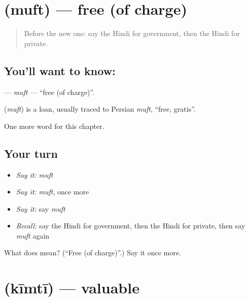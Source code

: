 \section[\texorpdfstring{\hi{मुफ़्त} (muft)}{मुफ़्त (muft)}]{ (muft) — free (of charge)}

\label{lesson:HI-C241-muft}



\begin{quote}
Before the new one: say the Hindi for government, then the Hindi for private.
\end{quote}

\subsection*{You'll want to know: }
\textbf{} — \emph{muft} — \textquotedblleft{}free (of charge)\textquotedblright{}.

\begin{cousinweb}
\textbf{} (\emph{muft}) is a loan, usually traced to Persian \emph{muft}, \textquotedblleft{}free, gratis\textquotedblright{}.
\end{cousinweb}

\begin{grammarlens}[title={What you've built}]
One more word for this chapter.
\end{grammarlens}

\subsection*{Your turn}
\begin{itemize}
\raggedright
  \item \emph{Say it:} \emph{muft}
  \item \emph{Say it:} \emph{muft}, once more
  \item \emph{Say it:} say \emph{muft}
  \item \emph{Recall:} say the Hindi for government, then the Hindi for private, then say \emph{muft} again
\end{itemize}

\begin{tcolorbox}[breakable,colback=teal!4,colframe=teal!35!black,title={Before you move on}]
What does  mean? (\textquotedblleft{}Free (of charge)\textquotedblright{}.) Say it once more.
\end{tcolorbox}
\section[\texorpdfstring{\hi{क़ीमती} (kīmtī)}{क़ीमती (kīmtī)}]{ (kīmtī) — valuable}

